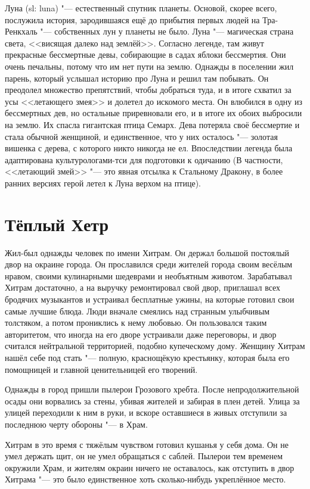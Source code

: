 \documentclass[a4paper,10pt]{book}
\begin{document}
Луна (sl: luna) "--- естественный спутник планеты. Основой, скорее 
всего, послужила история, зародившаяся ещё до прибытия первых людей на 
Тра-Ренкхаль "--- собственных лун у планеты не было. Луна "--- магическая 
страна 
света, <<висящая далеко над землёй>>. Согласно легенде, там живут прекрасные 
бессмертные девы, собирающие в садах яблоки бессмертия. Они очень печальны, 
потому что им нет пути на землю. Однажды в поселении жил парень, который 
услышал 
историю про Луна и решил там побывать. Он преодолел множество препятствий, 
чтобы 
добраться туда, и в итоге схватил за усы <<летающего змея>> и долетел до 
искомого места. Он влюбился в одну из бессмертных дев, но остальные 
приревновали 
его, и в итоге их обоих выбросили на землю. Их спасла гигантская птица Семарх. 
Дева потеряла своё бессмертие и стала обычной женщиной, и единственное, что у 
них осталось "--- золотая вишенка с дерева, с которого никто никогда не ел. 
Впоследствии легенда была адаптирована культурологами-тси для подготовки к 
одичанию
(В частности, <<летающий змей>> "--- это явная отсылка к Стальному Дракону, в 
более ранних версиях
герой летел к Луна верхом на птице).

\section{Тёплый Хетр}

Жил-был однажды человек по имени Хитрам. Он держал большой постоялый двор на 
окраине города. Он прославился среди жителей города своим весёлым нравом, 
своими кулинарными шедеврами и необъятным животом. Зарабатывал Хитрам 
достаточно, а на выручку ремонтировал свой двор, приглашал всех бродячих 
музыкантов и устраивал бесплатные ужины, на которые готовил свои самые лучшие 
блюда. Люди вначале смеялись над странным улыбчивым толстяком, а потом 
прониклись к нему любовью. Он пользовался таким авторитетом, что иногда на его 
дворе устраивали даже переговоры, и двор считался нейтральной территорией, 
подобно купеческому дому. Женщину Хитрам нашёл себе под стать "--- полную, 
краснощёкую крестьянку, которая была его помощницей и главной ценительницей его 
творений.

Однажды в город пришли пылерои Грозового хребта. После непродолжительной осады 
они ворвались за стены, убивая жителей и забирая в плен детей. Улица за улицей 
переходили к ним в руки, и вскоре оставшиеся в живых отступили за последнюю 
черту обороны "--- в Храм.

Хитрам в это время с тяжёлым чувством готовил кушанья у себя дома. Он не умел 
держать щит, он не умел обращаться с саблей. Пылерои тем временем окружили 
Храм, и жителям окраин ничего не оставалось, как отступить в двор Хитрама "--- 
это было единственное хоть сколько-нибудь укреплённое место.
\end{document}
